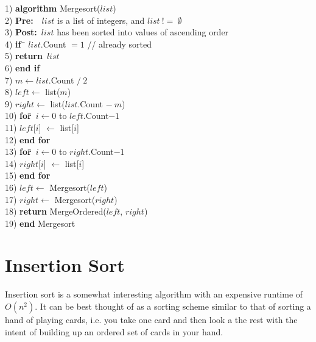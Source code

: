 \documentclass[10pt,oneside,a4paper]{report}
\begin{document}
\begin{tabbing}
1)  \textbf{alg}\= \textbf{orithm} Mergesort($list$) \\
2)  \> \textbf{Pre:}~~$list$ is a list of integers, and $list~!=~\emptyset$ \\
3)  \> \textbf{Post:}~$list$ has been sorted into values of ascending order \\
4)  \> \textbf{if}~\= $list$.Count $= 1$ // already sorted \\
5)  \> \> \textbf{return}~$list$ \\
6)  \> \textbf{end if} \\
7)  \> $m \leftarrow list$.Count $/~2$ \\
8)  \> $left \leftarrow$ list($m$) \\
9)  \> $right \leftarrow$ list($list$.Count $-~m$) \\
10) \> \textbf{for}\=~$i \leftarrow 0$ to $left$.Count$-1$ \\
11) \> \> $left$[$i$] $\leftarrow$ list[$i$] \\
12) \> \textbf{end for} \\
13) \> \textbf{for}\=~$i \leftarrow 0$ to $right$.Count$-1$ \\
14) \> \> $right$[$i$] $\leftarrow$ list[$i$] \\
15) \> \textbf{end for} \\
16) \> $left \leftarrow$ Mergesort($left$) \\
17) \> $right \leftarrow$ Mergesort($right$) \\
18) \> \textbf{return} MergeOrdered($left$, $right$) \\
19) \textbf{end} Mergesort \\
\end{tabbing}

\section{Insertion Sort}
Insertion sort is a somewhat interesting algorithm with an expensive runtime of $O(n^{2})$. It can be best thought of as a sorting scheme similar to that of sorting a hand of playing cards, i.e. you take one card and then look a the rest with the intent of building up an ordered set of cards in your hand.
\end{document}
